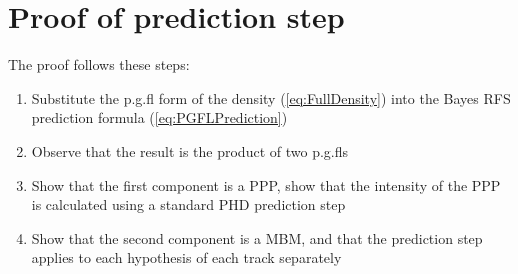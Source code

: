 \documentclass[journal,twoside]{IEEEtran}
\theoremstyle{plain}
\begin{document}
\section{Proof of prediction step}
\label{app:PredictionProof}
\begin{IEEEproof}
The proof follows these steps:
\begin{enumerate}
\item Substitute the p.g.fl form of the density (\ref{eq:FullDensity}) into the Bayes RFS prediction formula (\ref{eq:PGFLPrediction})
\item Observe that the result is the product of two p.g.fls 
\item Show that the first component is a PPP, show that the intensity of the PPP is calculated using a standard PHD prediction step \cite{Mah03,VoMa06}
\item Show that the second component is a MBM, and that the prediction step applies to each hypothesis of each track separately
\end{enumerate}


\end{IEEEproof}
\end{document}
